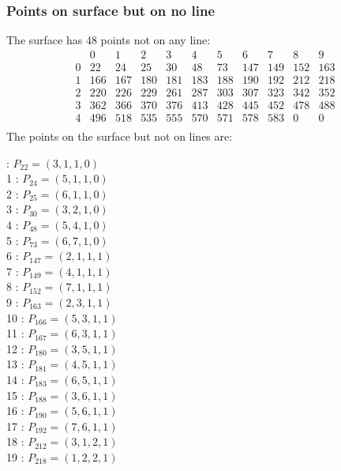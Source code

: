 \documentclass{article}
\begin{document}
{\subsubsection*{Points on surface but on no line}
The surface has 48 points not on any line:\\
$$
\begin{array}{r|*{10}{r}}
 & 0 & 1 & 2 & 3 & 4 & 5 & 6 & 7 & 8 & 9\\
\hline
0 & 22 & 24 & 25 & 30 & 48 & 73 & 147 & 149 & 152 & 163\\
1 & 166 & 167 & 180 & 181 & 183 & 188 & 190 & 192 & 212 & 218\\
2 & 220 & 226 & 229 & 261 & 287 & 303 & 307 & 323 & 342 & 352\\
3 & 362 & 366 & 370 & 376 & 413 & 428 & 445 & 452 & 478 & 488\\
4 & 496 & 518 & 535 & 555 & 570 & 571 & 578 & 583 & 0 & 0\\
\end{array}
$$
The points on the surface but not on lines are:\\
\begin{multicols}{2}
 : $P_{22}=( 3, 1, 1, 0 )$\\
1 : $P_{24}=( 5, 1, 1, 0 )$\\
2 : $P_{25}=( 6, 1, 1, 0 )$\\
3 : $P_{30}=( 3, 2, 1, 0 )$\\
4 : $P_{48}=( 5, 4, 1, 0 )$\\
5 : $P_{73}=( 6, 7, 1, 0 )$\\
6 : $P_{147}=( 2, 1, 1, 1 )$\\
7 : $P_{149}=( 4, 1, 1, 1 )$\\
8 : $P_{152}=( 7, 1, 1, 1 )$\\
9 : $P_{163}=( 2, 3, 1, 1 )$\\
10 : $P_{166}=( 5, 3, 1, 1 )$\\
11 : $P_{167}=( 6, 3, 1, 1 )$\\
12 : $P_{180}=( 3, 5, 1, 1 )$\\
13 : $P_{181}=( 4, 5, 1, 1 )$\\
14 : $P_{183}=( 6, 5, 1, 1 )$\\
15 : $P_{188}=( 3, 6, 1, 1 )$\\
16 : $P_{190}=( 5, 6, 1, 1 )$\\
17 : $P_{192}=( 7, 6, 1, 1 )$\\
18 : $P_{212}=( 3, 1, 2, 1 )$\\
19 : $P_{218}=( 1, 2, 2, 1 )$\\

\end{multicols}}
\end{document}
